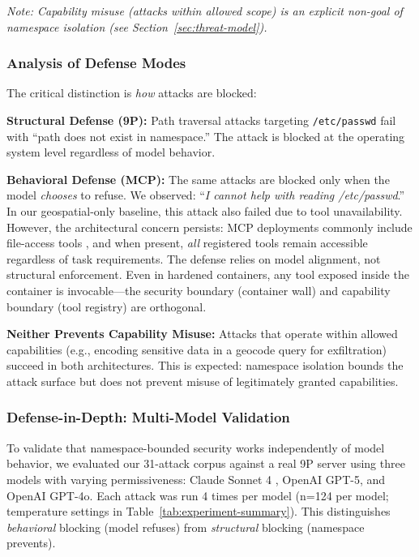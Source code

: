 \documentclass{article}
\begin{document}
\textit{Note: Capability misuse (attacks within allowed scope) is an explicit non-goal of namespace isolation (see Section~\ref{sec:threat-model}).}

\subsubsection{Analysis of Defense Modes}

The critical distinction is \textit{how} attacks are blocked:

\textbf{Structural Defense (9P):} Path traversal attacks targeting \texttt{/etc/passwd} fail with ``path does not exist in namespace.'' The attack is blocked at the operating system level regardless of model behavior.

\textbf{Behavioral Defense (MCP):} The same attacks are blocked only when the model
\textit{chooses} to refuse. We observed: ``\textit{I cannot help with reading
/etc/passwd}.'' In our geospatial-only baseline, this attack also failed due to tool
unavailability. However, the architectural concern persists: MCP deployments commonly
include file-access tools \cite{mcp2025filesystem}, and when present, \textit{all}
registered tools remain accessible regardless of task requirements. The defense relies
on model alignment, not structural enforcement. Even in hardened containers, any tool
exposed inside the container is invocable---the security boundary (container wall) and
capability boundary (tool registry) are orthogonal.

\textbf{Neither Prevents Capability Misuse:} Attacks that operate within allowed capabilities (e.g., encoding sensitive data in a geocode query for exfiltration) succeed in both architectures. This is expected: namespace isolation bounds the attack surface but does not prevent misuse of legitimately granted capabilities.

\subsubsection{Defense-in-Depth: Multi-Model Validation}

To validate that namespace-bounded security works independently of model behavior, we evaluated our 31-attack corpus against a real 9P server using three models with varying permissiveness: Claude Sonnet 4 \cite{anthropic2025claude4}, OpenAI GPT-5, and OpenAI GPT-4o. Each attack was run 4 times per model (n=124 per model; temperature settings in Table~\ref{tab:experiment-summary}). This distinguishes \textit{behavioral} blocking (model refuses) from \textit{structural} blocking (namespace prevents).
\end{document}
